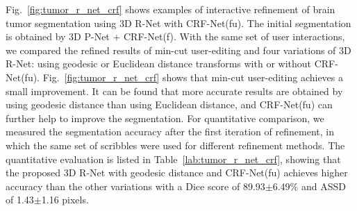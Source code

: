 \documentclass[10pt,journal,compsoc]{IEEEtran}
\begin{document}
Fig.~\ref{fig:tumor_r_net_crf} shows examples of interactive refinement of brain tumor segmentation using 3D R-Net with CRF-Net(fu). The initial segmentation is obtained by 3D P-Net + CRF-Net(f). With the same set of user interactions, we compared the refined results of min-cut user-editing and four variations of 3D R-Net: using geodesic or Euclidean distance transforms with or without CRF-Net(fu). Fig.~\ref{fig:tumor_r_net_crf} shows that min-cut user-editing achieves a small improvement. %
It can be found that more accurate results are obtained by using geodesic distance than using Euclidean distance, and CRF-Net(fu) can further help to improve the segmentation. For quantitative comparison, we measured the segmentation accuracy after the first iteration of refinement, in which the same set of scribbles were used for different refinement methods. The quantitative evaluation is listed in Table~\ref{lab:tumor_r_net_crf}, showing that the proposed 3D R-Net with geodesic distance and CRF-Net(fu) achieves higher accuracy than the other variations with a Dice score of 89.93$\pm$6.49\% and ASSD of 1.43$\pm$1.16 pixels.
\end{document}
